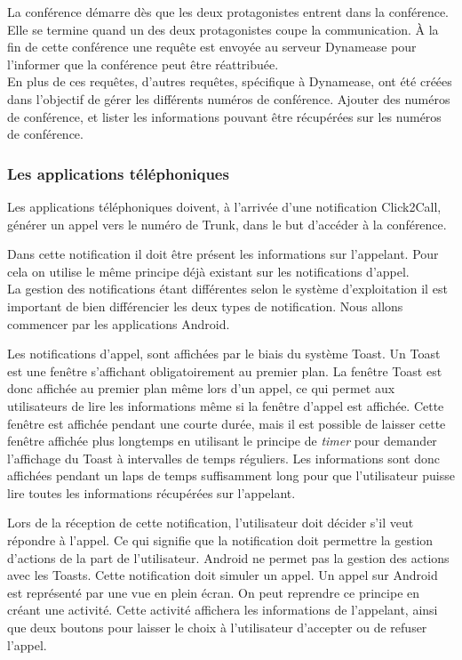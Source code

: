 La conférence démarre dès que les deux protagonistes entrent dans la conférence. Elle se termine quand un des deux protagonistes coupe la communication. À la fin de cette conférence une requête est envoyée au serveur Dynamease pour l'informer que la conférence peut être réattribuée.\\

En plus de ces requêtes, d'autres requêtes, spécifique à Dynamease, ont été créées dans l'objectif de gérer les différents numéros de conférence. Ajouter des numéros de conférence, et lister les informations pouvant être récupérées sur les numéros de conférence.

\subsubsection{Les applications téléphoniques} 

Les applications téléphoniques doivent, à l'arrivée d'une notification Click2Call, générer un appel vers le numéro de Trunk, dans le but d'accéder à la conférence.

Dans cette notification il doit être présent les informations sur l'appelant. Pour cela on utilise le même principe déjà existant sur les notifications d'appel.\\

La gestion des notifications étant différentes selon le système d'exploitation il est important de bien différencier les deux types de notification. Nous allons commencer par les applications Android.

Les notifications d'appel, sont affichées par le biais du système Toast. Un Toast est une fenêtre s'affichant obligatoirement au premier plan. La fenêtre Toast est donc affichée au premier plan même lors d'un appel, ce qui permet aux utilisateurs de lire les informations même si la fenêtre d'appel est affichée. Cette fenêtre est affichée pendant une courte durée, mais il est possible de laisser cette fenêtre affichée plus longtemps en utilisant le principe de \textit{timer} pour demander l'affichage du Toast à intervalles de temps réguliers. Les informations sont donc affichées pendant un laps de temps suffisamment long pour que l'utilisateur puisse lire toutes les informations récupérées sur l'appelant.

Lors de la réception de cette notification, l'utilisateur doit décider s'il veut répondre à l'appel. Ce qui signifie que la notification doit permettre la gestion d'actions de la part de l'utilisateur. Android ne permet pas la gestion des actions avec les Toasts. Cette notification doit simuler un appel. Un appel sur Android est représenté par une vue en plein écran. On peut reprendre ce principe en créant une activité. Cette activité affichera les informations de l'appelant, ainsi que deux boutons pour laisser le choix à l'utilisateur d'accepter ou de refuser l'appel.

